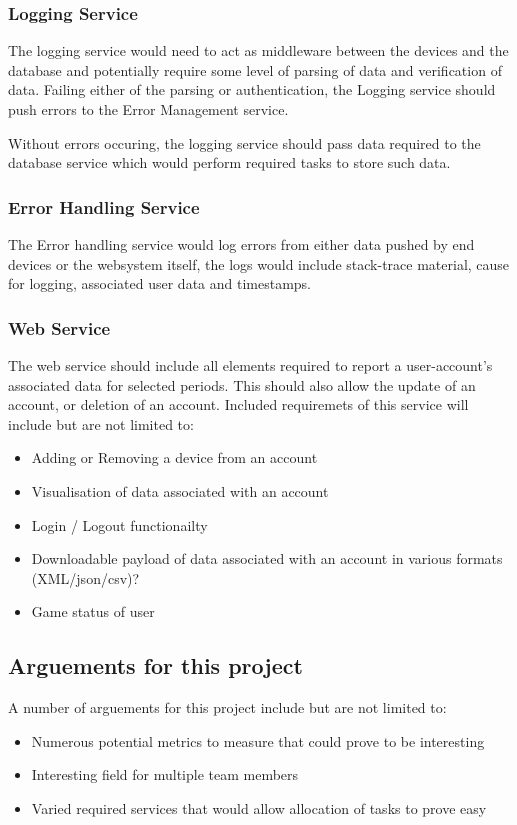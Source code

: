 \documentclass{article}
\begin{document}
            \subsubsection{Logging Service}
            The logging service would need to act as middleware between the devices and the database and 
            potentially require some level of parsing of data and verification of data. Failing either of the
            parsing or authentication, the Logging service should push errors to the Error Management service.
            \par
            Without errors occuring, the logging service should pass data required to the database service which
            would perform required tasks to store such data.

            \subsubsection{Error Handling Service}
            The Error handling service would log errors from either data pushed by end devices or the websystem itself,
            the logs would include stack-trace material, cause for logging, associated user data and timestamps.

            \subsubsection{Web Service}
            The web service should include all elements required to report a user-account's associated data
            for selected periods. This should also allow the update of an account, or deletion of an account.
            Included requiremets of this service will include but are not limited to:
            \begin{itemize}
                \item Adding or Removing a device from an account
                \item Visualisation of data associated with an account
                \item Login / Logout functionailty
                \item Downloadable payload of data associated with an account in various formats (XML/json/csv)?
                \item Game status of user
            \end{itemize}
            
            \subsection{Arguements for this project}
            A number of arguements for this project include but are not limited to:
            \begin{itemize}
                \item Numerous potential metrics to measure that could prove to be interesting
                \item Interesting field for multiple team members
                \item Varied required services that would allow allocation of tasks to prove easy
            \end{itemize}
\end{document}
